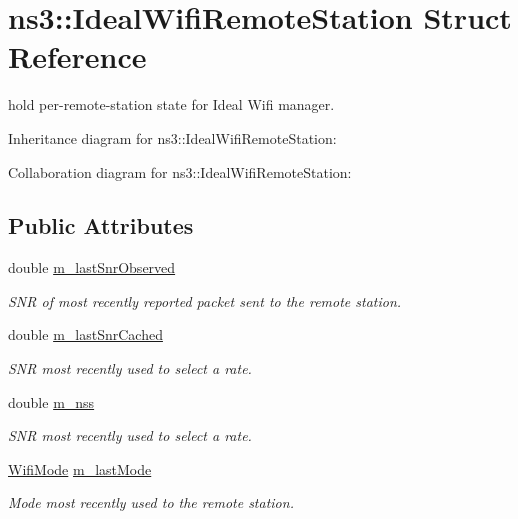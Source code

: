 \hypertarget{structns3_1_1IdealWifiRemoteStation}{}\section{ns3\+:\+:Ideal\+Wifi\+Remote\+Station Struct Reference}
\label{structns3_1_1IdealWifiRemoteStation}


hold per-\/remote-\/station state for Ideal Wifi manager.  




Inheritance diagram for ns3\+:\+:Ideal\+Wifi\+Remote\+Station\+:


Collaboration diagram for ns3\+:\+:Ideal\+Wifi\+Remote\+Station\+:
\subsection*{Public Attributes}
\begin{DoxyCompactItemize}
\item 
double \hyperlink{structns3_1_1IdealWifiRemoteStation_a1e769a6ae77882fcbcf48944d9795a2e}{m\+\_\+last\+Snr\+Observed}
\begin{DoxyCompactList}\small\item\em S\+NR of most recently reported packet sent to the remote station. \end{DoxyCompactList}\item 
double \hyperlink{structns3_1_1IdealWifiRemoteStation_a27a1926ef8173e8d0b5ee722037030a7}{m\+\_\+last\+Snr\+Cached}
\begin{DoxyCompactList}\small\item\em S\+NR most recently used to select a rate. \end{DoxyCompactList}\item 
double \hyperlink{structns3_1_1IdealWifiRemoteStation_a98bccc591a044824986b623bc20c817c}{m\+\_\+nss}
\begin{DoxyCompactList}\small\item\em S\+NR most recently used to select a rate. \end{DoxyCompactList}\item 
\hyperlink{classns3_1_1WifiMode}{Wifi\+Mode} \hyperlink{structns3_1_1IdealWifiRemoteStation_a0f12556151d7c08a087bb4392070f6fe}{m\+\_\+last\+Mode}
\begin{DoxyCompactList}\small\item\em Mode most recently used to the remote station. \end{DoxyCompactList}\end{DoxyCompactItemize}
